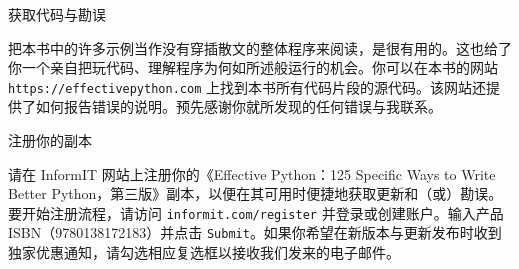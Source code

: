 获取代码与勘误

把本书中的许多示例当作没有穿插散文的整体程序来阅读，是很有用的。这也给了你一个亲自把玩代码、理解程序为何如所述般运行的机会。你可以在本书的网站 \texttt{https://effectivepython.com} 上找到本书所有代码片段的源代码。该网站还提供了如何报告错误的说明。预先感谢你就所发现的任何错误与我联系。

注册你的副本

请在 InformIT 网站上注册你的《Effective Python：125 Specific Ways to Write Better Python，第三版》副本，以便在其可用时便捷地获取更新和（或）勘误。要开始注册流程，请访问 \texttt{informit.com/register} 并登录或创建账户。输入产品 ISBN（9780138172183）并点击 \texttt{Submit}。如果你希望在新版本与更新发布时收到独家优惠通知，请勾选相应复选框以接收我们发来的电子邮件。
